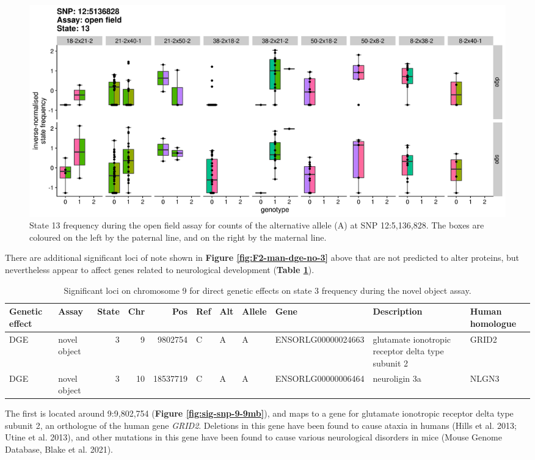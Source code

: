 \documentclass[
]{book}
\begin{document}
\begin{figure}
\includegraphics[width=1\linewidth]{figs/mikk_behaviour/sig_snps_boxplots/13-12:5136828} \caption{State 13 frequency during the open field assay for counts of the alternative allele (A) at SNP 12:5,136,828. The boxes are coloured on the left by the paternal line, and on the right by the maternal line.}\label{fig:sig-snp-12-5mb}
\end{figure}

There are additional significant loci of note shown in \textbf{Figure \ref{fig:F2-man-dge-no-3}} above that are not predicted to alter proteins, but nevertheless appear to affect genes related to neurological development (\textbf{Table \ref{tab:tbl-sig-snp-chr-9-10}}).

\begin{table}

\caption{\label{tab:tbl-sig-snp-chr-9-10}Significant loci on chromosome 9 for direct genetic effects on state 3 frequency during the novel object assay.}
\centering
\begin{tabular}[t]{llrrrllllll}
\toprule
Genetic effect & Assay & State & Chr & Pos & Ref & Alt & Allele & Gene & Description & Human homologue\\
\midrule
DGE & novel object & 3 & 9 & 9802754 & C & A & A & ENSORLG00000024663 & glutamate ionotropic receptor delta type subunit 2 & GRID2\\
DGE & novel object & 3 & 10 & 18537719 & C & A & A & ENSORLG00000006464 & neuroligin 3a & NLGN3\\
\bottomrule
\end{tabular}
\end{table}

The first is located around 9:9,802,754 (\textbf{Figure \ref{fig:sig-snp-9-9mb}}), and maps to a gene for glutamate ionotropic receptor delta type subunit 2, an orthologue of the human gene \emph{GRID2}. Deletions in this gene have been found to cause ataxia in humans (Hills et al. 2013; Utine et al. 2013), and other mutations in this gene have been found to cause various neurological disorders in mice (Mouse Genome Database, Blake et al. 2021).
\end{document}
